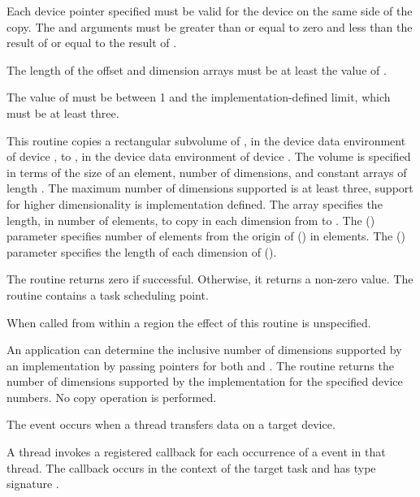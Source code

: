 \constraints
Each device pointer specified must be valid for the device on the same side
of the copy. The  and
 arguments must be greater than or equal to zero and
less than the result of  or equal to
the result of .

The length of the offset and dimension arrays must be at least the
value of .

The value of  must be between 1 and the implementation-defined
limit, which must be at least three.


\effect
This routine copies a rectangular subvolume of ,
in the device data environment of device ,
to , in the device data environment of device .
The volume is specified in terms of the size of an element,
number of dimensions, and constant arrays of length .  The
maximum number of dimensions supported is at least three, support for higher
dimensionality is implementation defined. The  array specifies the
length, in number of elements, to copy in each dimension from 
to . The  () parameter specifies
number of elements from the origin of  () in elements.
The  () parameter specifies the
length of each dimension of  ().

The routine returns zero if successful.
Otherwise, it returns a non-zero value. The
routine contains a task scheduling point.

When called from within a  region
the effect of this routine is unspecified.

An application can determine the inclusive number of dimensions supported by an implementation by passing  pointers for both  and .
The routine returns the number of dimensions supported
by the implementation for the specified device numbers.
No copy operation is performed.

\events
The  event occurs when a thread transfers data on a target device.

\tools

A thread invokes a registered 
callback for each occurrence of a  event in that
thread. The callback occurs in the context of the target task and
has type signature .


